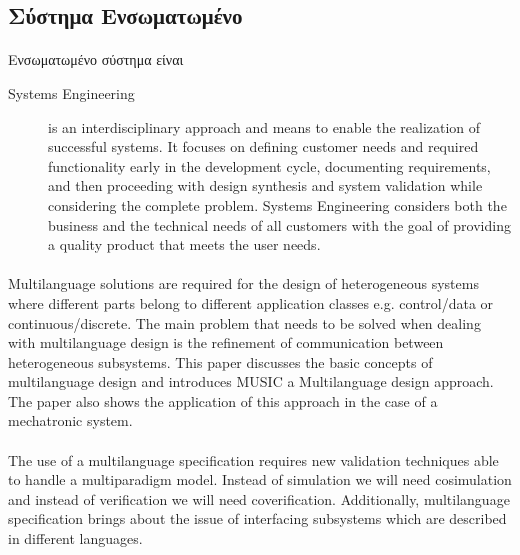\documentclass[a4paper,12pt,twoside]{report}
\begin{document}
		\subsection{Σύστημα Ενσωματωμένο}
			\paragraph{}{Ενσωματωμένο σύστημα είναι
			}
		
			\begin{description}
				\item [Systems Engineering] is an interdisciplinary approach and means to enable the realization of successful systems. It focuses on defining customer needs and required functionality  early in the development cycle, documenting requirements, and then proceeding with design synthesis  and system validation while considering the complete problem. Systems Engineering considers both  the business and the technical needs of all customers with the goal of providing a quality product  that meets the user needs. \cite{IncoseSEH}
			\end{description}
			
			\paragraph{} {Multilanguage solutions are required for the design of heterogeneous systems where different parts belong to different application classes e.g. control/data or continuous/discrete. The main problem that needs to be solved when dealing with multilanguage design is the refinement of communication between heterogeneous subsystems. This paper discusses the basic concepts of multilanguage design and introduces MUSIC a Multilanguage design approach. The paper also shows the application of this approach in the case of a mechatronic system. \cite{MultilanguageDesignHeterogeneousSystems}
			}
		
			\paragraph{}{The use of a multilanguage specification requires new validation techniques able to handle a multiparadigm model. Instead of simulation we will need cosimulation and instead of verification we will need coverification. Additionally, multilanguage specification brings about the issue of interfacing subsystems which are described in different languages. \cite{SMWirelessSensorNetwork}
			}
		
\end{document}
